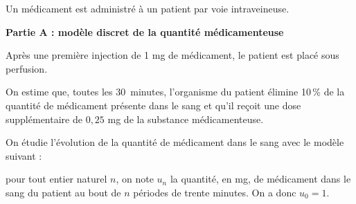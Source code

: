 Un médicament est administré à un patient par voie intraveineuse. 

\bigskip

\textbf{Partie A : modèle discret de la quantité médicamenteuse}

\medskip

Après une première injection de 1 mg de médicament, le patient est placé sous perfusion.

On estime que, toutes les $30$~minutes, l'organisme du patient élimine 10\,\% de la quantité de médicament présente dans le sang et qu'il reçoit une dose supplémentaire de $0,25$ mg de la substance médicamenteuse.

On étudie l'évolution de la quantité de médicament dans le sang avec le modèle suivant :

pour tout entier naturel $n$, on note $u_n$ la quantité, en mg, de médicament dans le sang du patient au bout de $n$ périodes de trente minutes. On a donc $u_0 = 1$.

